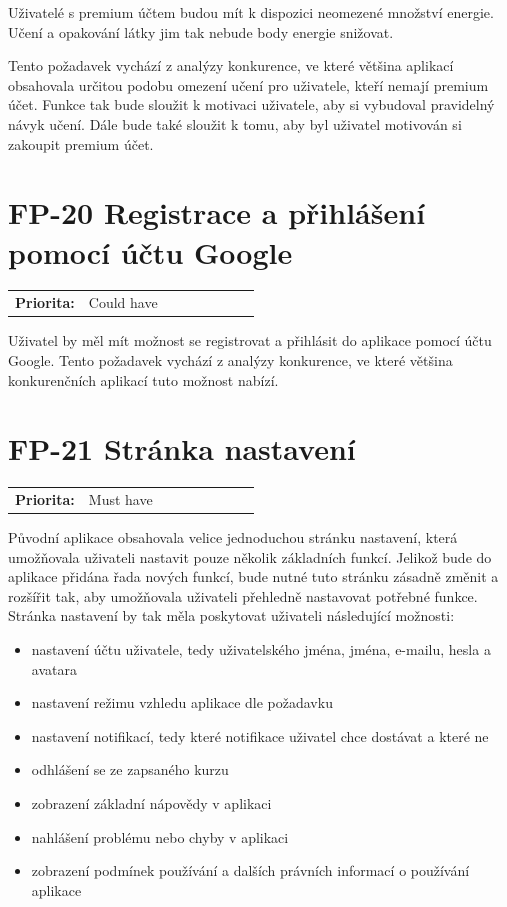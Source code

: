 Uživatelé s premium účtem budou mít k dispozici neomezené množství energie. Učení a opakování látky jim tak nebude body energie snižovat.

Tento požadavek vychází z analýzy konkurence, ve které většina aplikací obsahovala určitou podobu omezení učení pro uživatele, kteří nemají premium účet. Funkce tak bude sloužit k motivaci uživatele, aby si vybudoval pravidelný návyk učení. Dále bude také sloužit k tomu, aby byl uživatel motivován si zakoupit premium účet.

\section{FP-20 Registrace a přihlášení pomocí účtu Google}\label{sec:fp-google-auth}

\begin{tabular}{lp{0.7\linewidth}}
    \textbf{Priorita:} & Could have \\
\end{tabular}

Uživatel by měl mít možnost se registrovat a přihlásit do aplikace pomocí účtu Google. Tento požadavek vychází z analýzy konkurence, ve které většina konkurenčních aplikací tuto možnost nabízí.

\section{FP-21 Stránka nastavení}\label{sec:fp-settings-page}

\begin{tabular}{lp{0.7\linewidth}}
    \textbf{Priorita:} & Must have \\
\end{tabular}

Původní aplikace obsahovala velice jednoduchou stránku nastavení, která umožňovala uživateli nastavit pouze několik základních funkcí. Jelikož bude do aplikace přidána řada nových funkcí, bude nutné tuto stránku zásadně změnit a rozšířit tak, aby umožňovala uživateli přehledně nastavovat potřebné funkce. Stránka nastavení by tak měla poskytovat uživateli následující možnosti:

\begin{itemize}
    \item nastavení účtu uživatele, tedy uživatelského jména, jména, e-mailu, hesla a avatara
    \item nastavení režimu vzhledu aplikace dle požadavku 
    \item nastavení notifikací, tedy které notifikace uživatel chce dostávat a které ne
    \item odhlášení se ze zapsaného kurzu
    \item zobrazení základní nápovědy v aplikaci
    \item nahlášení problému nebo chyby v aplikaci
    \item zobrazení podmínek používání a dalších právních informací o používání aplikace
\end{itemize}

